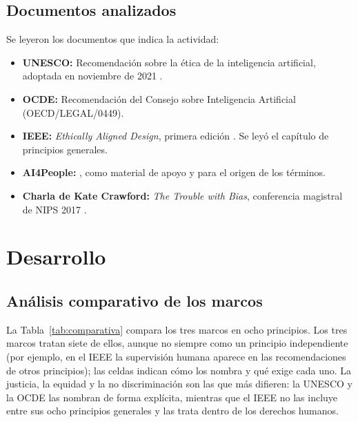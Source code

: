 \documentclass[11pt,letterpaper]{article}
\begin{document}
\subsection*{Documentos analizados}

Se leyeron los documentos que indica la actividad:
\begin{itemize}
    \item \textbf{UNESCO:} Recomendación sobre la ética de la inteligencia artificial, adoptada en noviembre de 2021 \parencite{unesco2021}.
    \item \textbf{OCDE:} Recomendación del Consejo sobre Inteligencia Artificial (OECD/LEGAL/0449).
    \item \textbf{IEEE:} \textit{Ethically Aligned Design}, primera edición \parencite{ieee2019}. Se leyó el capítulo de principios generales.
    \item \textbf{AI4People:} \parencite{floridi2018}, como material de apoyo y para el origen de los términos.
    \item \textbf{Charla de Kate Crawford:} \textit{The Trouble with Bias}, conferencia magistral de NIPS 2017 \parencite{crawford2017}.
\end{itemize}

\section{Desarrollo}

\subsection{Análisis comparativo de los marcos}

La Tabla~\ref{tab:comparativa} compara los tres marcos en ocho principios. Los tres marcos tratan siete de ellos, aunque no siempre como un principio independiente (por ejemplo, en el IEEE la supervisión humana aparece en las recomendaciones de otros principios); las celdas indican cómo los nombra y qué exige cada uno. La justicia, la equidad y la no discriminación son las que más difieren: la UNESCO y la OCDE las nombran de forma explícita, mientras que el IEEE no las incluye entre sus ocho principios generales y las trata dentro de los derechos humanos.
\end{document}
